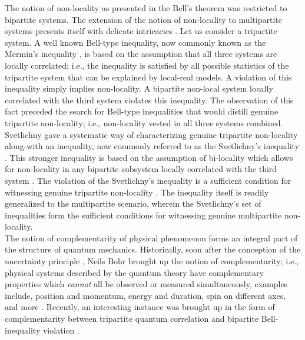 \documentclass[%
 reprint,
 amsmath,amssymb,
 aps,
]{revtex4-1}
\theoremstyle{plain}
\begin{document}
The notion of non-locality as presented in the Bell's theorem was restricted to bipartite systems. The extension of the notion of non-locality to multipartite systems presents itself with delicate intricacies \cite{brunner2014bell}. Let us consider a tripartite system. A well known Bell-type inequality, now commonly known as the Mermin's inequality \cite{mermin1980quantum,mermin1990extreme}, is based on the assumption that all three systems are locally correlated; i.e., the inequality is satisfied by all possible statistics of the tripartite system that can be explained by local-real models. A violation of this inequality simply implies non-locality. A bipartite non-local system locally correlated with the third system violates this inequality. The observation of this fact preceded the search for Bell-type inequalities that would distill genuine tripartite non-locality; i.e., non-locality vested in all three systems combined. Svetlichny gave a systematic way of characterizing genuine tripartite non-locality along-with an inequality, now commonly referred to as the Svetlichny's inequality \cite{svetlichny1987distinguishing}. This stronger inequality is based on the assumption of bi-locality which allows for non-locality in any bipartite subsystem locally correlated with the third system \cite{svetlichny1987distinguishing}. The violation of the Svetlichny's inequality is a sufficient condition for witnessing genuine tripartite non-locality \cite{bancal2011device}. The inequality itself is readily generalized to the multipartite scenario, wherein the Svetlichny's set of inequalities form the sufficient conditions for witnessing genuine multipartite non-locality.\\
The notion of complementarity of physical phenomenon forms an integral part of the structure of quantum mechanics. Historically, soon after the conception of the uncertainty principle \cite{heisenberg1927anschaulichen}, Neils Bohr brought up the notion of complementarity; i.e., physical systems described by the quantum theory have complementary properties which \textit{cannot} all be observed or measured simultaneously, examples include, position and momentum, energy and duration, spin on different axes, and more \cite{sazim2015complementarity}. Recently, an interesting instance was brought up in the form of complementarity between tripartite quantum correlation and bipartite Bell-inequality violation \cite{pandya2016complementarity}.\\ 
\end{document}
